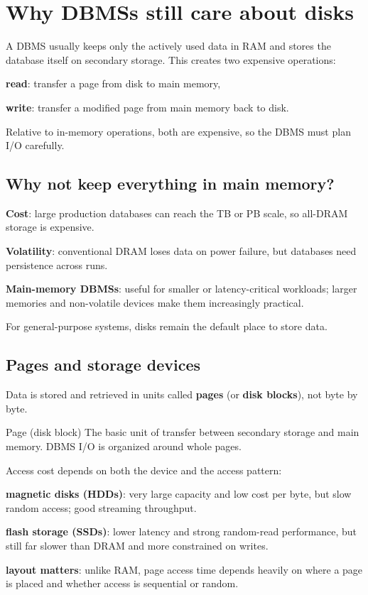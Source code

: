\documentclass[../../dis.tex]{subfiles}
\begin{document}
\newpage
\section{Why DBMSs still care about disks}
A DBMS usually keeps only the actively used data in RAM and stores the database itself on secondary storage. This creates two expensive operations:

\begin{dashlist}
    \item \textbf{read}: transfer a page from disk to main memory,
    \item \textbf{write}: transfer a modified page from main memory back to disk.
\end{dashlist}

Relative to in-memory operations, both are expensive, so the DBMS must plan I/O carefully.

\subsection{Why not keep everything in main memory?}
\begin{dashlist}
    \item \textbf{Cost}: large production databases can reach the TB or PB scale, so all-DRAM storage is expensive.
    \item \textbf{Volatility}: conventional DRAM loses data on power failure, but databases need persistence across runs.
    \item \textbf{Main-memory DBMSs}: useful for smaller or latency-critical workloads; larger memories and non-volatile devices make them increasingly practical.
\end{dashlist}

For general-purpose systems, disks remain the default place to store data.

\subsection{Pages and storage devices}
Data is stored and retrieved in units called \textbf{pages} (or \textbf{disk blocks}), not byte by byte.

\begin{concept}{Page (disk block)}\label{def:diskpage}
The basic unit of transfer between secondary storage and main memory. DBMS I/O is organized around whole pages.
\end{concept}

Access cost depends on both the device and the access pattern:
\begin{dashlist}
    \item \textbf{magnetic disks (HDDs)}: very large capacity and low cost per byte, but slow random access; good streaming throughput.
    \item \textbf{flash storage (SSDs)}: lower latency and strong random-read performance, but still far slower than DRAM and more constrained on writes.
    \item \textbf{layout matters}: unlike RAM, page access time depends heavily on where a page is placed and whether access is sequential or random.
\end{dashlist}
\end{document}
